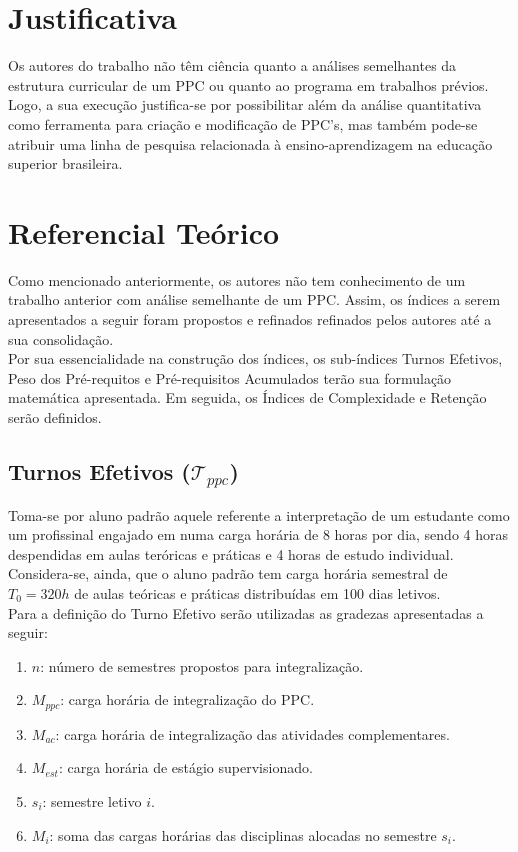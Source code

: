 \documentclass[a4paper, 12pt]{article}
\begin{document}
\section*{Justificativa}

Os autores do trabalho não têm ciência quanto a análises semelhantes da estrutura curricular de um PPC ou quanto ao programa em trabalhos 
prévios. Logo, a sua execução justifica-se por possibilitar além da análise quantitativa como ferramenta para criação e modificação de PPC's, 
mas também pode-se atribuir uma linha de pesquisa relacionada à ensino-aprendizagem na educação superior brasileira.

\section*{Referencial Teórico}
Como mencionado anteriormente, os autores não tem conhecimento de um trabalho anterior com análise semelhante de um PPC. Assim, os índices a serem apresentados 
a seguir foram propostos e refinados refinados pelos autores até a sua consolidação. \\ 

Por sua essencialidade na construção dos índices, os sub-índices Turnos Efetivos, Peso dos Pré-requitos e Pré-requisitos Acumulados terão sua formulação 
matemática apresentada. Em seguida, os Índices de Complexidade e Retenção serão definidos.

\subsection*{Turnos Efetivos ($\mathcal{T}_{ppc}$)}
Toma-se por aluno padrão aquele referente a interpretação de um estudante como um profissinal engajado em numa carga horária de 8 horas por dia, sendo 
4 horas despendidas em aulas teróricas e práticas e 4 horas de estudo individual. Considera-se, ainda, que o aluno padrão tem carga horária semestral de 
$T_0 = 320h$ de aulas teóricas e práticas distribuídas em 100 dias letivos. \\ 

Para a definição do Turno Efetivo serão utilizadas as gradezas apresentadas a seguir: \\

\begin{enumerate}
\item $n$: número de semestres propostos para integralização.
\item $M_{ppc}$: carga horária de integralização do PPC.
\item $M_{ac}$: carga horária de integralização das atividades complementares.
\item $M_{est}$: carga horária de estágio supervisionado.
\item $s_i$: semestre letivo $i$.
\item $M_i$: soma das cargas horárias das disciplinas alocadas no semestre $s_i$.
\end{enumerate}
\end{document}
